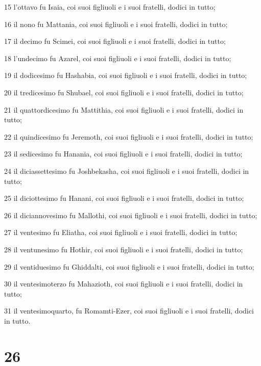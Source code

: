 \par 15 l'ottavo fu Isaia, coi suoi figliuoli e i suoi fratelli, dodici in tutto;
\par 16 il nono fu Mattania, coi suoi figliuoli e i suoi fratelli, dodici in tutto;
\par 17 il decimo fu Scimei, coi suoi figliuoli e i suoi fratelli, dodici in tutto;
\par 18 l'undecimo fu Azarel, coi suoi figliuoli e i suoi fratelli, dodici in tutto;
\par 19 il dodicesimo fu Hashabia, coi suoi figliuoli e i suoi fratelli, dodici in tutto;
\par 20 il tredicesimo fu Shubael, coi suoi figliuoli e i suoi fratelli, dodici in tutto;
\par 21 il quattordicesimo fu Mattithia, coi suoi figliuoli e i suoi fratelli, dodici in tutto;
\par 22 il quindicesimo fu Jeremoth, coi suoi figliuoli e i suoi fratelli, dodici in tutto;
\par 23 il sedicesimo fu Hanania, coi suoi figliuoli e i suoi fratelli, dodici in tutto;
\par 24 il diciassettesimo fu Joshbekasha, coi suoi figliuoli e i suoi fratelli, dodici in tutto;
\par 25 il diciottesimo fu Hanani, coi suoi figliuoli e i suoi fratelli, dodici in tutto;
\par 26 il diciannovesimo fu Mallothi, coi suoi figliuoli e i suoi fratelli, dodici in tutto;
\par 27 il ventesimo fu Eliatha, coi suoi figliuoli e i suoi fratelli, dodici in tutto;
\par 28 il ventunesimo fu Hothir, coi suoi figliuoli e i suoi fratelli, dodici in tutto;
\par 29 il ventiduesimo fu Ghiddalti, coi suoi figliuoli e i suoi fratelli, dodici in tutto;
\par 30 il ventesimoterzo fu Mahazioth, coi suoi figliuoli e i suoi fratelli, dodici in tutto;
\par 31 il ventesimoquarto, fu Romamti-Ezer, coi suoi figliuoli e i suoi fratelli, dodici in tutto.

\chapter{26}

